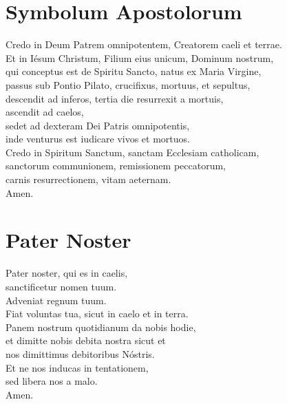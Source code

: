 \documentclass[paper=a5,pagesize=pdftex,fontsize=10pt,headinclude=on,twoside=off]{scrbook}
\begin{document}
\section{Symbolum Apostolorum}
\begin{scripture}
  \begin{poetry}
    Credo in Deum Patrem omnipotentem, Creatorem caeli et terrae.\\
    Et in Iésum Christum, Filium eius unicum, Dominum nostrum,\\
    qui conceptus est de Spiritu Sancto, natus ex Maria Virgine,\\
    passus sub Pontio Pilato, crucifixus, mortuus, et sepultus,\\
    descendit ad inferos, tertia die resurrexit a mortuis,\\
    ascendit ad caelos,\\
    sedet ad dexteram Dei Patris omnipotentis,\\
    inde venturus est iudicare vivos et mortuos.\\
    Credo in Spiritum Sanctum, sanctam Ecclesiam catholicam,\\
    sanctorum communionem, remissionem peccatorum,\\
    carnis resurrectionem, vitam aeternam.\\
    Amen.\\
  \end{poetry}
\end{scripture}

\vspace{3pt}
\section{Pater Noster}
\begin{scripture}
  \begin{poetry}
    Pater noster, qui es in caelis,\\
    sanctificetur nomen tuum.\\
    Adveniat regnum tuum.\\
    Fiat voluntas tua, sicut in caelo et in terra.\\
    Panem nostrum quotidianum da nobis hodie,\\
    et dimitte nobis debita nostra sicut et\\
    nos dimittimus debitoribus Nóstris.\\
    Et ne nos inducas in tentationem,\\
    sed libera nos a malo.\\
    Amen.\\
  \end{poetry}
\end{scripture}
\end{document}
